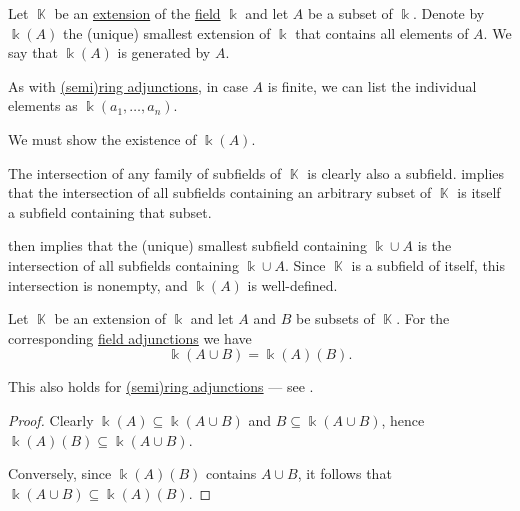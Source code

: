 \begin{definition}\label{def:field_adjunction}
  Let \( \BbbK \) be an \hyperref[def:field/submodel]{extension} of the \hyperref[def:field]{field} \( \Bbbk \) and let \( A \) be a subset of \( \Bbbk \). Denote by \( \Bbbk(A) \) the (unique) smallest extension of \( \Bbbk \) that contains all elements of \( A \). We say that \( \Bbbk(A) \) is generated by  \( A \).

  As with \hyperref[def:semiring_adjunction]{(semi)ring adjunctions}, in case \( A \) is finite, we can list the individual elements as \( \Bbbk(a_1, \ldots, a_n) \).
\end{definition}
\begin{defproof}
  We must show the existence of \( \Bbbk(A) \).

  The intersection of any family of subfields of \( \BbbK \) is clearly also a subfield.  implies that the intersection of all subfields containing an arbitrary subset of \( \BbbK \) is itself a subfield containing that subset.

   then implies that the (unique) smallest subfield containing \( \Bbbk \cup A \) is the intersection of all subfields containing \( \Bbbk \cup A \). Since \( \BbbK \) is a subfield of itself, this intersection is nonempty, and \( \Bbbk(A) \) is well-defined.
\end{defproof}

\begin{proposition}\label{thm:field_adjunction_tower}
  Let \( \BbbK \) be an extension of \( \Bbbk \) and let \( A \) and \( B \) be subsets of \( \BbbK \). For the corresponding \hyperref[def:field_adjunction]{field adjunctions} we have
  \begin{equation*}
    \Bbbk(A \cup B) = \Bbbk(A)(B).
  \end{equation*}
\end{proposition}
\begin{comments}
  \item This also holds for \hyperref[def:semiring_adjunction]{(semi)ring adjunctions} --- see .
\end{comments}
\begin{proof}
  Clearly \( \Bbbk(A) \subseteq \Bbbk(A \cup B) \) and \( B \subseteq \Bbbk(A \cup B) \), hence \( \Bbbk(A)(B) \subseteq \Bbbk(A \cup B) \).

  Conversely, since \( \Bbbk(A)(B) \) contains \( A \cup B \), it follows that \( \Bbbk(A \cup B) \subseteq \Bbbk(A)(B) \).
\end{proof}

